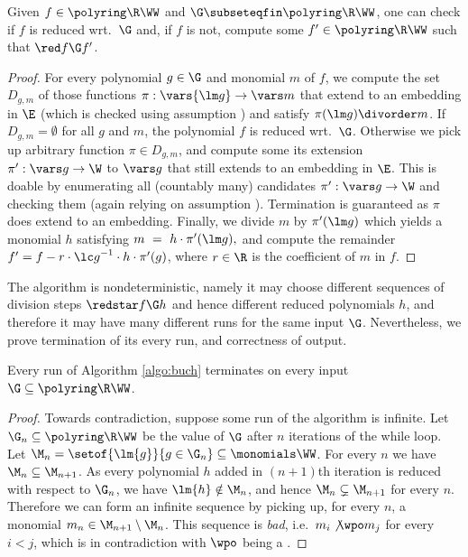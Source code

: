 \begin{lemma}[Computability] \label{lem:alg}
Given $f\in\polyring\R\WW$ and $\G\subseteqfin\polyring\R\WW$,
one can check if $f$ is reduced wrt.~$\G$ and,
if $f$ is not, compute some $f'\in\polyring\R\WW$ such that $\red f \G f'$. 
\end{lemma}
%
\begin{proof}
For every polynomial $g\in\G$ and monomial $m$ of $f$,
we compute the set $D_{g,m}$ of those 
functions $\pi : \vars {\lm g} \to \vars m$ 
that extend to an embedding in $\E$
(which is checked using assumption ) and satisfy $\pi(\lm g) \divorder m$.
If $D_{g,m} = \emptyset$ for all $g$ and $m$, the polynomial $f$ is reduced wrt.~$\G$.
Otherwise we pick up arbitrary function $\pi  \in D_{g,m}$,
and compute some its extension
 $\pi' : \vars g \to \W$ to $\vars g$ that still extends
to an embedding in $\E$.
This is doable by enumerating all (countably many) candidates $\pi':\vars g \to \W$ and checking them
(again relying on assumption ).
Termination is guaranteed as $\pi$ does extend to an embedding.
Finally, we divide 
$m$ by $\pi'(\lm g)$ which yields a monomial $h$ satisfying
$
m \ = \ h  \cdot \pi'(\lm g),
$
and compute the remainder $f' = f - r\cdot {\lc g}^{-1} \cdot h\cdot \pi'(g)$, where
$r\in\R$ is the coefficient of $m$ in $f$.
\end{proof}

The algorithm is nondeterministic, namely it may choose different 
sequences of division steps $\redstar f \G h$ and hence different reduced polynomials $h$, 
and therefore it may have many different runs for the same input $\G$.
Nevertheless, we prove termination of its every run, and correctness of output.

\begin{lemma}[Termination]\label{lem:buch stops}
Every run of Algorithm \ref{algo:buch} terminates on every input $\G\subseteq\polyring \R \WW$.
\end{lemma}
%
\begin{proof}
Towards contradiction, suppose some run of the algorithm is infinite.
Let $\G_n \subseteq \polyring \R \WW$ 
be the value of $\G$ after $n$ iterations of the while loop.
Let $\M_n = \setof{\lm{g}}{g \in \G_n} \subseteq \monomials \WW$.
For every $n$ we have $\M_n \subseteq \M_{n+1}$.
As every polynomial $h$ added in $(n+1)$th iteration is reduced with respect to $\G_{n}$,
we have $\lm{h} \notin \M_n$, and hence
$\M_n \subsetneq \M_{n+1}$ for every $n$.
Therefore we can form an infinite sequence by picking up, for every $n$, a monomial
$m_n\in \M_{n+1} \setminus \M_n$.
This sequence is \emph{bad}, i.e.~$m_i \not\wpo m_j$ for every $i<j$, which is in
contradiction with $\wpo$ being a \wqo.
\end{proof}
%

